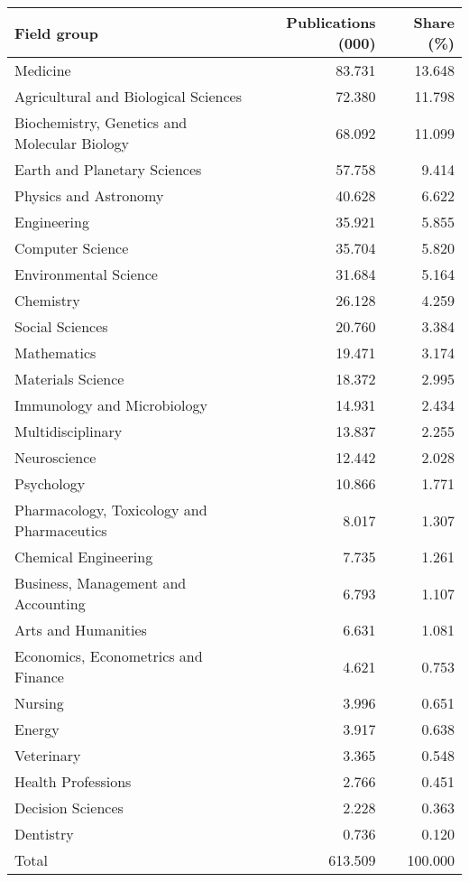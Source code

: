 
\begin{tabular}{lrr}
\toprule
Field group & Publications (000) & Share (\%)\\
\midrule
Medicine & 83.731 & 13.648\\
Agricultural and Biological Sciences & 72.380 & 11.798\\
Biochemistry, Genetics and Molecular Biology & 68.092 & 11.099\\
Earth and Planetary Sciences & 57.758 & 9.414\\
Physics and Astronomy & 40.628 & 6.622\\
Engineering & 35.921 & 5.855\\
Computer Science & 35.704 & 5.820\\
Environmental Science & 31.684 & 5.164\\
Chemistry & 26.128 & 4.259\\
Social Sciences & 20.760 & 3.384\\
Mathematics & 19.471 & 3.174\\
Materials Science & 18.372 & 2.995\\
Immunology and Microbiology & 14.931 & 2.434\\
Multidisciplinary & 13.837 & 2.255\\
Neuroscience & 12.442 & 2.028\\
Psychology & 10.866 & 1.771\\
Pharmacology, Toxicology and Pharmaceutics & 8.017 & 1.307\\
Chemical Engineering & 7.735 & 1.261\\
Business, Management and Accounting & 6.793 & 1.107\\
Arts and Humanities & 6.631 & 1.081\\
Economics, Econometrics and Finance & 4.621 & 0.753\\
Nursing & 3.996 & 0.651\\
Energy & 3.917 & 0.638\\
Veterinary & 3.365 & 0.548\\
Health Professions & 2.766 & 0.451\\
Decision Sciences & 2.228 & 0.363\\
Dentistry & 0.736 & 0.120\\
\midrule
Total & 613.509 & 100.000\\
\bottomrule
\end{tabular}
